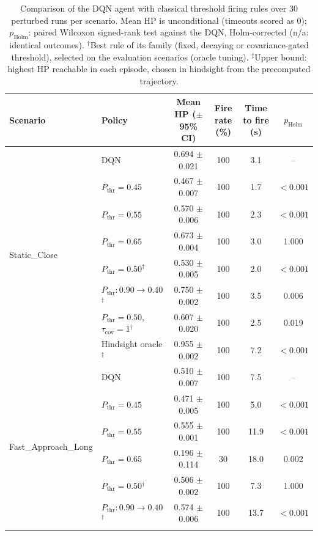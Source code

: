 \begin{table}[htbp]
\centering
\caption{Comparison of the DQN agent with classical threshold firing rules over 30 perturbed runs per scenario. Mean HP is unconditional (timeouts scored as 0); $p_{\mathrm{Holm}}$: paired Wilcoxon signed-rank test against the DQN, Holm-corrected (n/a: identical outcomes). $^{\dagger}$Best rule of its family (fixed, decaying or covariance-gated threshold), selected on the evaluation scenarios (oracle tuning). $^{\ddagger}$Upper bound: highest HP reachable in each episode, chosen in hindsight from the precomputed trajectory.}
\label{tab:comparison-traditional-rl}
\small
\begin{tabular}{llcccc}
\toprule
\textbf{Scenario} & \textbf{Policy} & \textbf{Mean HP ($\pm$95\% CI)} & \textbf{Fire rate (\%)} & \textbf{Time to fire (s)} & $p_{\mathrm{Holm}}$ \\
\midrule
\multirow{8}{*}{Static\_Close} & DQN & 0.694 $\pm$ 0.021 & 100 & 3.1 & -- \\
 & $P_{\mathrm{thr}}=0.45$ & 0.467 $\pm$ 0.007 & 100 & 1.7 & $<0.001$ \\
 & $P_{\mathrm{thr}}=0.55$ & 0.570 $\pm$ 0.006 & 100 & 2.3 & $<0.001$ \\
 & $P_{\mathrm{thr}}=0.65$ & 0.673 $\pm$ 0.004 & 100 & 3.0 & 1.000 \\
 & $P_{\mathrm{thr}}=0.50$$^{\dagger}$ & 0.530 $\pm$ 0.005 & 100 & 2.0 & $<0.001$ \\
 & $P_{\mathrm{thr}}: 0.90 \to 0.40$$^{\dagger}$ & 0.750 $\pm$ 0.002 & 100 & 3.5 & 0.006 \\
 & $P_{\mathrm{thr}}=0.50$, $\tau_{\mathrm{cov}}=1$$^{\dagger}$ & 0.607 $\pm$ 0.020 & 100 & 2.5 & 0.019 \\
 & Hindsight oracle$^{\ddagger}$ & 0.955 $\pm$ 0.002 & 100 & 7.2 & $<0.001$ \\
\midrule
\multirow{8}{*}{Fast\_Approach\_Long} & DQN & 0.510 $\pm$ 0.007 & 100 & 7.5 & -- \\
 & $P_{\mathrm{thr}}=0.45$ & 0.471 $\pm$ 0.005 & 100 & 5.0 & $<0.001$ \\
 & $P_{\mathrm{thr}}=0.55$ & 0.555 $\pm$ 0.001 & 100 & 11.9 & $<0.001$ \\
 & $P_{\mathrm{thr}}=0.65$ & 0.196 $\pm$ 0.114 & 30 & 18.0 & 0.002 \\
 & $P_{\mathrm{thr}}=0.50$$^{\dagger}$ & 0.506 $\pm$ 0.002 & 100 & 7.3 & 1.000 \\
 & $P_{\mathrm{thr}}: 0.90 \to 0.40$$^{\dagger}$ & 0.574 $\pm$ 0.006 & 100 & 13.7 & $<0.001$ \\
$$
\end{tabular}
\end{table}

